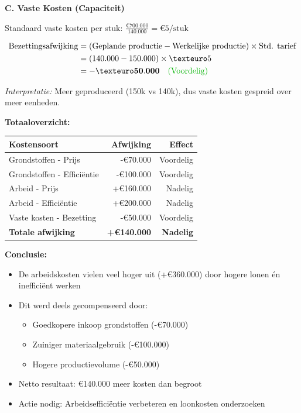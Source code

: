 \documentclass[a4paper,11pt]{article}
\begin{document}
\begin{oefenblok}
    \textbf{C. Vaste Kosten (Capaciteit)}

    Standaard vaste kosten per stuk: $\frac{€700.000}{140.000} = €5/\text{stuk}$

    \begin{align*}
        \text{Bezettingsafwijking} & = (\text{Geplande productie} - \text{Werkelijke productie}) \times \text{Std. tarief} \\
                                   & = (140.000 - 150.000) \times €5                                                       \\
                                   & = \mathbf{-€50.000} \quad \text{\textcolor{green!70!black}{(Voordelig)}}
    \end{align*}

    \textit{Interpretatie:} Meer geproduceerd (150k vs 140k), dus vaste kosten gespreid over meer eenheden.

    \textbf{Totaaloverzicht:}

    \begin{tabular}{lrr}
        \hline
        \textbf{Kostensoort}       & \textbf{Afwijking} & \textbf{Effect}  \\
        \hline
        Grondstoffen - Prijs       & -€70.000           & Voordelig        \\
        Grondstoffen - Efficiëntie & -€100.000          & Voordelig        \\
        Arbeid - Prijs             & +€160.000          & Nadelig          \\
        Arbeid - Efficiëntie       & +€200.000          & Nadelig          \\
        Vaste kosten - Bezetting   & -€50.000           & Voordelig        \\
        \hline
        \textbf{Totale afwijking}  & \textbf{+€140.000} & \textbf{Nadelig} \\
        \hline
    \end{tabular}

    \textbf{Conclusie:}
    \begin{itemize}
        \item De arbeidskosten vielen veel hoger uit (+€360.000) door hogere lonen én inefficiënt werken
        \item Dit werd deels gecompenseerd door:
              \begin{itemize}
                  \item Goedkopere inkoop grondstoffen (-€70.000)
                  \item Zuiniger materiaalgebruik (-€100.000)
                  \item Hogere productievolume (-€50.000)
              \end{itemize}
        \item Netto resultaat: €140.000 meer kosten dan begroot
        \item Actie nodig: Arbeidsefficiëntie verbeteren en loonkosten onderzoeken
    \end{itemize}
\end{oefenblok}
\end{document}
